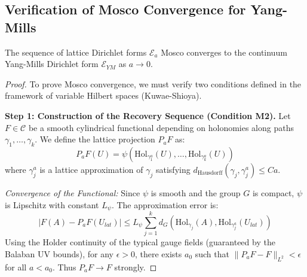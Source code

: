 \subsection{Verification of Mosco Convergence for Yang-Mills}

\begin{theorem}
\label{thm:ym-mosco-active}
\label{thm:spectral-mosco}
The sequence of lattice Dirichlet forms $\mathcal{E}_a$ Mosco converges to the continuum Yang-Mills Dirichlet form $\mathcal{E}_{YM}$ as $a \to 0$.
\end{theorem}

\begin{proof}
    To prove Mosco convergence, we must verify two conditions defined in the framework of variable Hilbert spaces (Kuwae-Shioya).
    
    \textbf{Step 1: Construction of the Recovery Sequence (Condition M2).}
    Let $F \in \mathcal{C}$ be a smooth cylindrical functional depending on holonomies along paths $\gamma_1, \dots, \gamma_k$. We define the lattice projection $P_a F$ as:
    \[ P_a F(U) = \psi(\mathrm{Hol}_{\gamma_1^a}(U), \dots, \mathrm{Hol}_{\gamma_k^a}(U)) \]
    where $\gamma_j^a$ is a lattice approximation of $\gamma_j$ satisfying $d_{\text{Hausdorff}}(\gamma_j, \gamma_j^a) \le C a$.
    
    \textit{Convergence of the Functional:}
    Since $\psi$ is smooth and the group $G$ is compact, $\psi$ is Lipschitz with constant $L_\psi$. The approximation error is:
    \[ |F(A) - P_a F(U_{lat})| \le L_\psi \sum_{j=1}^k d_G(\mathrm{Hol}_{\gamma_j}(A), \mathrm{Hol}_{\gamma_j^a}(U_{lat})) \]
    Using the Holder continuity of the typical gauge fields (guaranteed by the Balaban UV bounds), for any $\epsilon > 0$, there exists $a_0$ such that $\| P_a F - F \|_{L^2} < \epsilon$ for all $a < a_0$. Thus $P_a F \to F$ strongly.
    

\end{proof}
